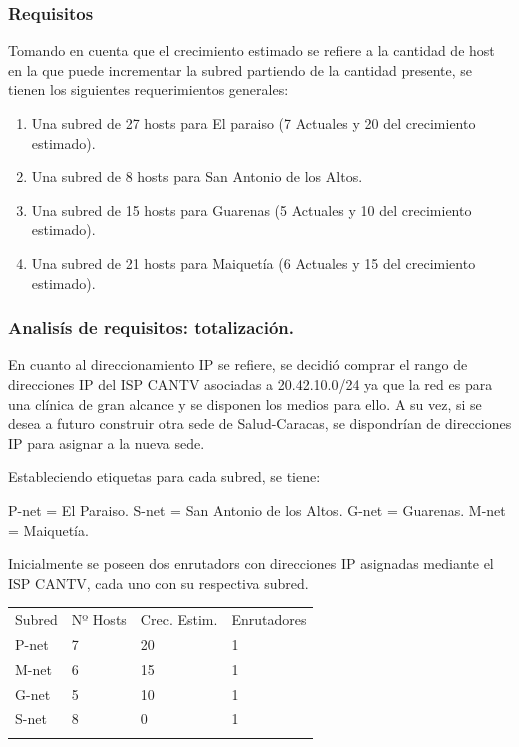 \documentclass[]{article}
\begin{document}
\subsubsection{Requisitos}\label{requisitos}

Tomando en cuenta que el crecimiento estimado se refiere a la cantidad
de host en la que puede incrementar la subred partiendo de la cantidad
presente, se tienen los siguientes requerimientos generales:

\begin{enumerate}
\def\labelenumi{\arabic{enumi}.}
\itemsep1pt\parskip0pt
\item
  Una subred de 27 hosts para El paraiso (7 Actuales y 20 del
  crecimiento estimado).
\item
  Una subred de 8 hosts para San Antonio de los Altos.
\item
  Una subred de 15 hosts para Guarenas (5 Actuales y 10 del crecimiento
  estimado).
\item
  Una subred de 21 hosts para Maiquetía (6 Actuales y 15 del crecimiento
  estimado).
\end{enumerate}

\subsubsection{Analisís de requisitos:
totalización.}\label{analisuxeds-de-requisitos-totalizaciuxf3n.}

En cuanto al direccionamiento IP se refiere, se decidió comprar el rango
de direcciones IP del ISP CANTV asociadas a 20.42.10.0/24 ya que la red
es para una clínica de gran alcance y se disponen los medios para ello.
A su vez, si se desea a futuro construir otra sede de Salud-Caracas, se
dispondrían de direcciones IP para asignar a la nueva sede.

Estableciendo etiquetas para cada subred, se tiene:

P-net = El Paraiso. S-net = San Antonio de los Altos. G-net = Guarenas.
M-net = Maiquetía.

Inicialmente se poseen dos enrutadors con direcciones IP asignadas
mediante el ISP CANTV, cada uno con su respectiva subred.

\begin{longtable}[c]{@{}llll@{}}
\toprule\addlinespace
Subred & Nº Hosts & Crec. Estim. & Enrutadores
\\\addlinespace
\midrule\endhead
P-net & 7 & 20 & 1
\\\addlinespace
M-net & 6 & 15 & 1
\\\addlinespace
G-net & 5 & 10 & 1
\\\addlinespace
S-net & 8 & 0 & 1
\\\addlinespace
\bottomrule
\end{longtable}
\end{document}
